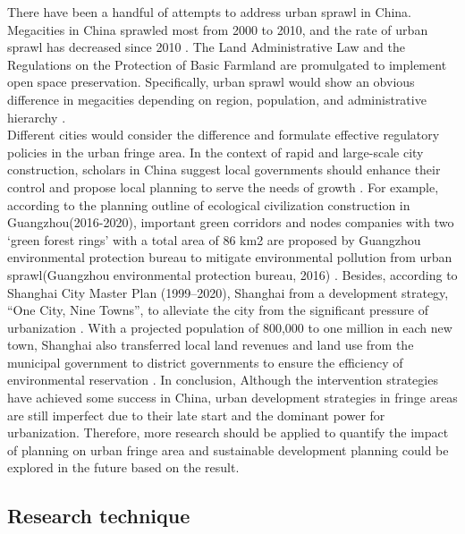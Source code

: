 There have been a handful of attempts to address urban sprawl in China. Megacities in China sprawled most from 2000 to 2010, and the rate of urban sprawl has decreased since 2010 \parencite{liu_urban_2018}. The Land Administrative Law and the Regulations on the Protection of Basic Farmland are promulgated to implement open space preservation. Specifically, urban sprawl would show an obvious difference in megacities depending on region, population, and administrative hierarchy \parencite{li_urban_2019}. \\

Different cities would consider the difference and formulate effective regulatory policies in the urban fringe area. In the context of rapid and large-scale city construction, scholars in China suggest local governments should enhance their control and propose local planning to serve the needs of growth \parencite{tian_measuring_2017}. For example, according to the planning outline of ecological civilization construction in Guangzhou(2016-2020), important green corridors and nodes companies with two ‘green forest rings’ with a total area of 86 km2 are proposed by Guangzhou environmental protection bureau to mitigate environmental pollution from urban sprawl(Guangzhou environmental protection bureau, 2016) \parencite{yu_spatial_2007}. Besides, according to Shanghai City Master Plan (1999–2020), Shanghai from a development strategy, “One City, Nine Towns”, to alleviate the city from the significant pressure of urbanization \parencite{tian_measuring_2017}. With a projected population of 800,000 to one million in each new town, Shanghai also transferred local land revenues and land use from the municipal government to district governments to ensure the efficiency of environmental reservation \parencite{wang_dynamics_2020}. In conclusion, Although the intervention strategies have achieved some success in China, urban development strategies in fringe areas are still imperfect due to their late start and the dominant power for urbanization. Therefore, more research should be applied to quantify the impact of planning on urban fringe area and sustainable development planning could be explored in the future based on the result.\\



\subsection{Research technique}
